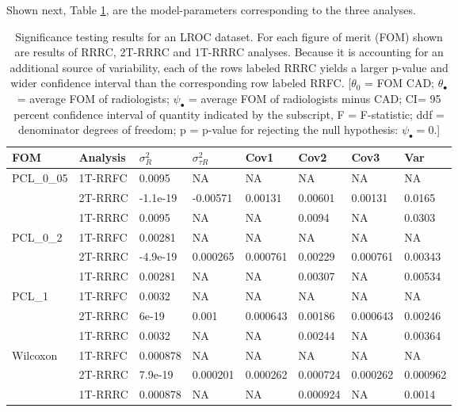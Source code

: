 \documentclass[
]{book}
\begin{document}
Shown next, Table \ref{tab:standalone-cad-table3}, are the model-parameters corresponding to the three analyses.

\begin{table}

\caption{\label{tab:standalone-cad-table3}Significance testing results for an LROC dataset. For each figure of merit (FOM) shown are results of RRRC, 2T-RRRC and 1T-RRRC analyses. Because it is accounting for an additional source of variability, each of the rows labeled RRRC yields a larger p-value and wider confidence interval than the corresponding row labeled RRFC. [$\theta_0$ = FOM CAD; $\theta_{\bullet}$ = average FOM of radiologists; $\psi_{\bullet}$ = average FOM of radiologists minus CAD; CI= 95 percent confidence interval of quantity indicated by the subscript, F = F-statistic; ddf = denominator degrees of freedom; p = p-value for rejecting the null hypothesis: $\psi_{\bullet} = 0$.]}
\centering
\fontsize{10}{12}\selectfont
\begin{tabular}[t]{llllllll}
\toprule
FOM & Analysis & $\sigma_R^2$ & $\sigma_{\tau R}^2$ & Cov1 & Cov2 & Cov3 & Var\\
\midrule
PCL\_0\_05 & 1T-RRFC & 0.0095 & NA & NA & NA & NA & NA\\
 & 2T-RRRC & -1.1e-19 & -0.00571 & 0.00131 & 0.00601 & 0.00131 & 0.0165\\
 & 1T-RRRC & 0.0095 & NA & NA & 0.0094 & NA & 0.0303\\
PCL\_0\_2 & 1T-RRFC & 0.00281 & NA & NA & NA & NA & NA\\
 & 2T-RRRC & -4.9e-19 & 0.000265 & 0.000761 & 0.00229 & 0.000761 & 0.00343\\
\addlinespace
 & 1T-RRRC & 0.00281 & NA & NA & 0.00307 & NA & 0.00534\\
PCL\_1 & 1T-RRFC & 0.0032 & NA & NA & NA & NA & NA\\
 & 2T-RRRC & 6e-19 & 0.001 & 0.000643 & 0.00186 & 0.000643 & 0.00246\\
 & 1T-RRRC & 0.0032 & NA & NA & 0.00244 & NA & 0.00364\\
Wilcoxon & 1T-RRFC & 0.000878 & NA & NA & NA & NA & NA\\
\addlinespace
 & 2T-RRRC & 7.9e-19 & 0.000201 & 0.000262 & 0.000724 & 0.000262 & 0.000962\\
 & 1T-RRRC & 0.000878 & NA & NA & 0.000924 & NA & 0.0014\\
\bottomrule
\end{tabular}
\end{table}
\end{document}
